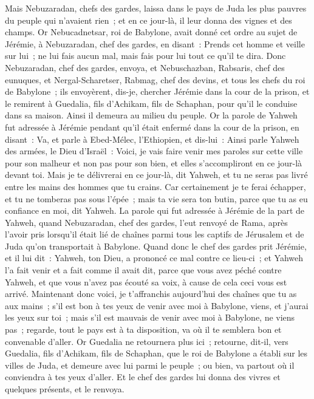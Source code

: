 \begin{multicols}{2}
Mais Nebuzaradan, chefs des gardes, laissa dans le pays de Juda les plus pauvres du peuple qui n'avaient rien~; et en ce jour-là, il leur donna des vignes et des champs.
Or Nebucadnetsar, roi de Babylone, avait donné cet ordre au sujet de Jérémie, à Nebuzaradan, chef des gardes, en disant~:
Prends cet homme et veille sur lui~; ne lui fais aucun mal, mais fais pour lui tout ce qu'il te dira.
Donc Nebuzaradan, chef des gardes, envoya, et Nebuschazban, Rabsaris, chef des eunuques, et Nergal-Scharetser, Rabmag, chef des devins, et tous les chefs du roi de Babylone~;
ils envoyèrent, dis-je, chercher Jérémie dans la cour de la prison, et le remirent à Guedalia, fils d'Achikam, fils de Schaphan, pour qu'il le conduise dans sa maison. Ainsi il demeura au milieu du peuple.
Or la parole de Yahweh fut adressée à Jérémie pendant qu'il était enfermé dans la cour de la prison, en disant~:
Va, et parle à Ebed-Mélec, l'Ethiopien, et dis-lui~: Ainsi parle Yahweh des armées, le Dieu d'Israël~: Voici, je vais faire venir mes paroles sur cette ville pour son malheur et non pas pour son bien, et elles s'accompliront en ce jour-là devant toi.
Mais je te délivrerai en ce jour-là, dit Yahweh, et tu ne seras pas livré entre les mains des hommes que tu crains.
Car certainement je te ferai échapper, et tu ne tomberas pas sous l'épée~; mais ta vie sera ton butin, parce que tu as eu confiance en moi, dit Yahweh.
\VerseOne{}La parole qui fut adressée à Jérémie de la part de Yahweh, quand Nebuzaradan, chef des gardes, l'eut renvoyé de Rama, après l'avoir pris lorsqu'il était lié de chaînes parmi tous les captifs de Jérusalem et de Juda qu'on transportait à Babylone.
Quand donc le chef des gardes prit Jérémie, et il lui dit~: Yahweh, ton Dieu, a prononcé ce mal contre ce lieu-ci~;
et Yahweh l'a fait venir et a fait comme il avait dit, parce que vous avez péché contre Yahweh, et que vous n'avez pas écouté sa voix, à cause de cela ceci vous est arrivé.
Maintenant donc voici, je t'affranchis aujourd'hui des chaînes que tu as aux mains~; s'il est bon à tes yeux de venir avec moi à Babylone, viens, et j'aurai les yeux sur toi~; mais s'il est mauvais de venir avec moi à Babylone, ne viens pas~; regarde, tout le pays est à ta disposition, va où il te semblera bon et convenable d'aller.
Or Guedalia ne retournera plus ici~; retourne, dit-il, vers Guedalia, fils d'Achikam, fils de Schaphan, que le roi de Babylone a établi sur les villes de Juda, et demeure avec lui parmi le peuple~; ou bien, va partout où il conviendra à tes yeux d'aller. Et le chef des gardes lui donna des vivres et quelques présents, et le renvoya.

\end{multicols}
